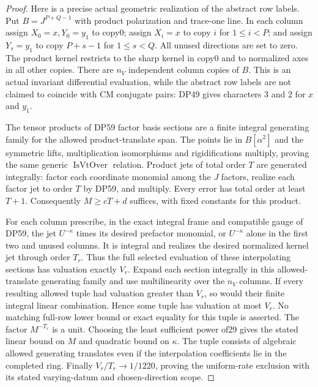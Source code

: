 \begin{proof}
Here is a precise actual geometric realization of the abstract row
labels. Put $B=J^{P+Q-1}$ with product polarization and trace-one line.
In each column assign $X_0=x,Y_0=y_1$ to copy0; assign $X_i=x$ to
copy $i$ for $1\le i<P$; and assign $Y_s=y_1$ to copy $P+s-1$ for
$1\le s<Q$. All unused directions are set to zero. The product kernel
restricts to the sharp kernel in copy0 and to normalized axes in all
other copies. There are $n_V$ independent column copies of $B$.
This is an actual invariant differential evaluation, while the abstract
row labels are not claimed to coincide with CM conjugate pairs:
DP49 gives characters $3$ and $2$ for $x$ and $y_1$.

The tensor products of DP59 factor basis sections are a finite integral
generating family for the allowed product-translate span. The points lie in $B[\alpha^2]$ and the symmetric lifts,
multiplication isomorphisms and rigidifications multiply, proving the
same generic $\operatorname{IsVtOver}$ relation. Product jets of total
order $T$ are generated integrally: factor each coordinate monomial
among the $J$ factors, realize each factor jet to order $T$ by DP59,
and multiply. Every error has total order at least $T+1$.
Consequently $M\ge cT+d$ suffices, with fixed constants for this product.

For each column prescribe, in the exact integral frame and compatible
gauge of DP59, the jet $U^{-\kappa}$ times its desired prefactor
monomial, or $U^{-\kappa}$ alone in the first two and unused columns.
It is integral and realizes the desired normalized kernel jet through
order $T_r$. Thus the full selected evaluation of these interpolating
sections has valuation exactly $V_r$. Expand each section integrally
in this allowed-translate generating family and use multilinearity over the $n_V$
columns. If every resulting allowed tuple had valuation greater than
$V_r$, so would their finite integral linear combination. Hence some
tuple has valuation at most $V_r$. No matching full-row lower bound or
exact equality for this tuple is asserted. The factor $M^{-T_r}$ is a
unit. Choosing the least sufficient power of29 gives the stated
linear bound on $M$ and quadratic bound on $\kappa$.
The tuple consists of algebraic allowed generating translates even if the
interpolation coefficients lie in the completed ring.
Finally $V_r/T_r\to1/1220$, proving the uniform-rate exclusion with
its stated varying-datum and chosen-direction scope.
\end{proof}
